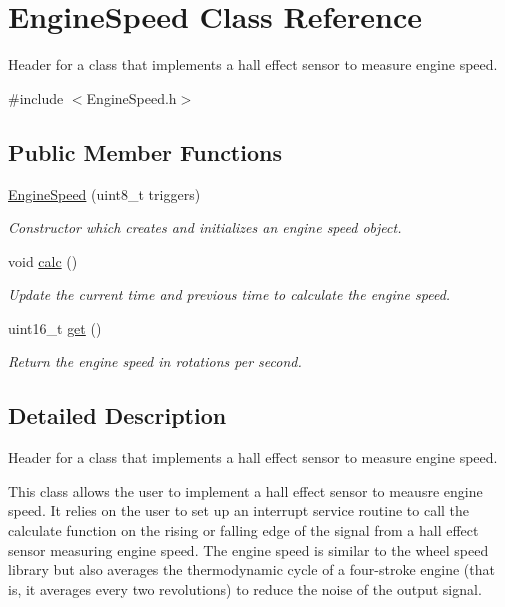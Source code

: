 \hypertarget{class_engine_speed}{}\section{Engine\+Speed Class Reference}
\label{class_engine_speed}


Header for a class that implements a hall effect sensor to measure engine speed.  




{\ttfamily \#include $<$Engine\+Speed.\+h$>$}

\subsection*{Public Member Functions}
\begin{DoxyCompactItemize}
\item 
\mbox{\hyperlink{class_engine_speed_abbb3a8246d5db034f984fe367c9d58d4}{Engine\+Speed}} (uint8\+\_\+t triggers)
\begin{DoxyCompactList}\small\item\em Constructor which creates and initializes an engine speed object. \end{DoxyCompactList}\item 
void \mbox{\hyperlink{class_engine_speed_a760d5c7e84e92e0fe42d56d2e7cf2a42}{calc}} ()
\begin{DoxyCompactList}\small\item\em Update the current time and previous time to calculate the engine speed. \end{DoxyCompactList}\item 
uint16\+\_\+t \mbox{\hyperlink{class_engine_speed_aa1e68329e56cf6dd0ff33ecd02e9af7b}{get}} ()
\begin{DoxyCompactList}\small\item\em Return the engine speed in rotations per second. \end{DoxyCompactList}\end{DoxyCompactItemize}


\subsection{Detailed Description}
Header for a class that implements a hall effect sensor to measure engine speed. 

This class allows the user to implement a hall effect sensor to meausre engine speed. It relies on the user to set up an interrupt service routine to call the calculate function on the rising or falling edge of the signal from a hall effect sensor measuring engine speed. The engine speed is similar to the wheel speed library but also averages the thermodynamic cycle of a four-\/stroke engine (that is, it averages every two revolutions) to reduce the noise of the output signal. 

